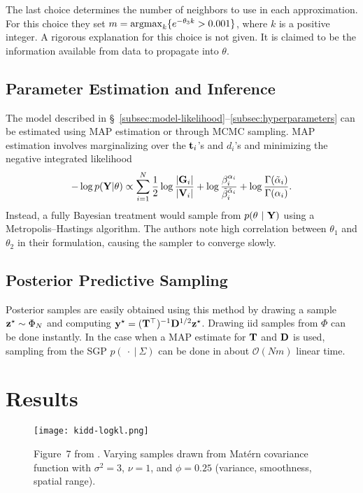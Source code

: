 \documentclass[letterpaper]{article}
\begin{document}
  The last choice determines the number of neighbors to use in each approximation.
  For this choice they set $m = \operatorname{\mathrm{argmax}}_{k}\{e^{-\theta_{3} k} > 0.001\}$, where
  $k$ is a positive integer. A rigorous explanation for this choice is not given.
  It is claimed to be the information available from data to propagate into $\theta$.
  
  \subsection{Parameter Estimation and Inference}\label{subsec:estimation}

  The model described in \S~\ref{subsec:model-likelihood}--\ref{subsec:hyperparameters}
  can be estimated using MAP estimation or through MCMC sampling. MAP estimation
  involves marginalizing over the $\mathbf{t}_{i}$'s and $d_{i}$'s and minimizing the
  negative integrated likelihood
  \begin{equation}
    -\log p(\mathbf{Y} | \theta) \propto \sum_{i=1}^{N}
    \frac{1}{2} \log\frac{|\mathbf{G}_{i}|}{|\mathbf{V}_{i}|} +
    \log\frac{\beta_{i}^{\alpha_{i}}}{\tilde{\beta}_{i}^{\tilde{\alpha}_{i}}} +
    \log\frac{\Gamma(\tilde{\alpha}_{i})}{\Gamma(\alpha_{i})}.
    \label{eqn:nll}
  \end{equation}
  Instead, a fully Bayesian treatment would sample from $p(\theta\ |\ \mathbf{Y})$
  using a Metropolis--Hastings algorithm. The authors note high correlation
  between $\theta_{1}$ and $\theta_{2}$ in their formulation, causing the
  sampler to converge slowly.

  \subsection{Posterior Predictive Sampling}\label{subsec:ppd-sampling}

  Posterior samples are easily obtained using this method by drawing a sample
  $\mathbf{z}^{\star} \sim \Phi_{N}$ and computing $\mathbf{y}^{\star} = (\mathbf{T}^{\top})^{-1}\mathbf{D}^{1/2}\mathbf{z}^{\star}$.
  Drawing iid samples from $\Phi$ can be done instantly. In the case when a MAP
  estimate for $\mathbf{T}$ and $\mathbf{D}$ is used, sampling from the SGP $p(\ \cdot\ |\ \Sigma)$
  can be done in about $\mathcal{O}(Nm)$ linear time.

\section{Results}\label{sec:results}
  
  \begin{figure}[ht]
    \centering
    \texttt{[image: kidd-logkl.png]}
    \caption{
      Figure~7 from \citet{Kidd2021}. Varying samples drawn from Mat\'{e}rn
      covariance function with $\sigma^2 = 3$, $\nu = 1$, and $\phi = 0.25$
      (variance, smoothness, spatial range).
    }
    \label{fig:logkl}
  \end{figure}
\end{document}

